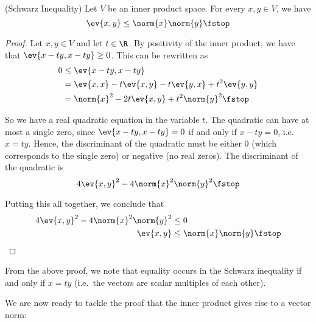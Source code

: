 \begin{proposition}
  (Schwarz Inequality) Let \( V \) be an inner product space. For every \( x,y\in V \), we have
  \[ \ev{x,y}\leq \norm{x}\norm{y}\fstop \]
\end{proposition}
\begin{proof}
  Let \( x,y\in V \) and let \( t\in\R \). By positivity of the inner product, we have that \( \ev{x-ty,x-ty}\geq 0 \). This can be rewritten as
  \begin{align*}
    0&\leq \ev{x-ty,x-ty}\\
    &= \ev{x,x}-t\ev{x,y}-t\ev{y,x}+t^2\ev{y,y}\\
    &= \norm{x}^2-2t\ev{x,y}+t^2\norm{y}^2\fstop
  \end{align*}
  
  So we have a real quadratic equation in the variable \( t \). The quadratic can have at most a single zero, since \( \ev{x-ty,x-ty}=0 \) if and only if \( x-ty=0 \), i.e.\ \( x=ty \). Hence, the discriminant of the quadratic must be either 0 (which corresponds to the single zero) or negative (no real zeros). The discriminant of the quadratic is
  \[ 4\ev{x,y}^2-4\norm{x}^2\norm{y}^2\fstop \]
  
  Putting this all together, we conclude that
  \begin{align*}
    4\ev{x,y}^2-4\norm{x}^2\norm{y}^2&\leq 0\\
    \ev{x,y}&\leq\norm{x}\norm{y}\fstop
  \end{align*}
\end{proof}

From the above proof, we note that equality occurs in the Schwarz inequality if and only if \( x=ty \) (i.e.\ the vectors are scalar multiples of each other).

\vspace{3mm}

We are now ready to tackle the proof that the inner product gives rise to a vector norm:

